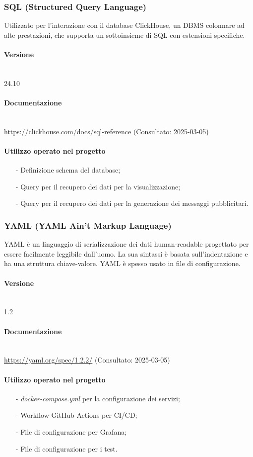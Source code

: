 \documentclass[10pt]{article}
\newcommand{\myparagraph}[1]{\paragraph{#1}\mbox{}\\\vspace{0.4em}}
\begin{document}
\begin{justify}
    \subsubsection{SQL (Structured Query Language)}
    Utilizzato per l'interazione con il database ClickHouse, un DBMS colonnare ad alte prestazioni, che supporta un sottoinsieme di SQL con estensioni specifiche.
        \myparagraph{Versione}
            24.10
        \myparagraph{Documentazione}
            \textcolor{blue}{\url{https://clickhouse.com/docs/sql-reference}} (Consultato: 2025-03-05)
        \paragraph{Utilizzo operato nel progetto}
            \begin{itemize}
                \item[-] Definizione schema del database;
                \item[-] Query per il recupero dei dati per la visualizzazione;
                \item[-] Query per il recupero dei dati per la generazione dei messaggi pubblicitari.
            \end{itemize}

    \subsubsection{YAML (YAML Ain't Markup Language)}
    YAML è un linguaggio di serializzazione dei dati human-readable progettato per essere facilmente leggibile dall'uomo. La sua 
    sintassi è basata sull'indentazione e ha una struttura chiave-valore. YAML è spesso usato in file di configurazione.
        \myparagraph{Versione} 
            1.2
        \myparagraph{Documentazione}
           \textcolor{blue}{\url{https://yaml.org/spec/1.2.2/}} (Consultato: 2025-03-05)
        \paragraph{Utilizzo operato nel progetto}
            \begin{itemize}
                \item[-] \textit{docker-compose.yml} per la configurazione dei servizi;
                \item[-] Workflow GitHub Actions per CI/CD;
                \item[-] File di configurazione per Grafana;
                \item[-] File di configurazione per i test.
            \end{itemize}

\end{justify}
\end{document}
